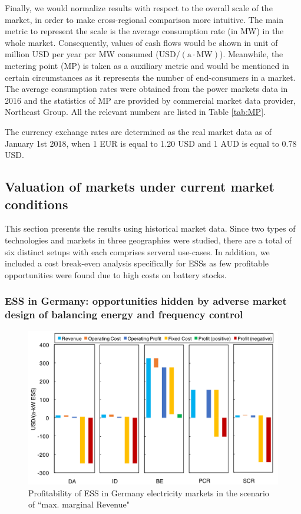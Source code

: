 Finally, we would normalize results with respect to the overall scale of the market, in order to make cross-regional comparison more intuitive. The main metric to represent the scale is the average consumption rate (in MW) in the whole market. Consequently, values of cash flows would be shown in unit of million USD per year per MW consumed (USD/$(\text{a} \cdot \text{MW})$). Meanwhile, the metering point (MP) is taken as a auxiliary metric and would be mentioned in certain circumstances as it represents the number of end-consumers in a market. The average consumption rates were obtained from the power markets data in 2016 and the statistics of MP are provided by commercial market data provider, Northeast Group\cite{NortheastGroup2016}\cite{NortheastGroup2017}\cite{NortheastGroup2017a}. All the relevant numbers are listed in Table \ref{tab:MP}.

The currency exchange rates are determined as the real market data as of January 1st 2018, when 1 EUR is equal to 1.20 USD and 1 AUD is equal to 0.78 USD\cite{Bloomberg}.

\subsection{Valuation of markets under current market conditions}
This section presents the results using historical market data. Since two types of technologies and markets in three geographies were studied, there are a total of six distinct setups with each comprises serveral use-cases. In addition, we included a cost break-even analysis specifically for ESSs as few profitable opportunities were found due to high costs on battery stocks.

\subsubsection{ESS in Germany: opportunities hidden by adverse market design of balancing energy and frequency control}

\begin{figure}[h!]
	\centering
	\includegraphics[width=0.9\linewidth]{Figures/Germany_ESS_profitability}
	\caption{Profitability of ESS in Germany electricity markets in the scenario of ``max. marginal Revenue"}
	\label{fig:germany-ess-profitability}
\end{figure}

